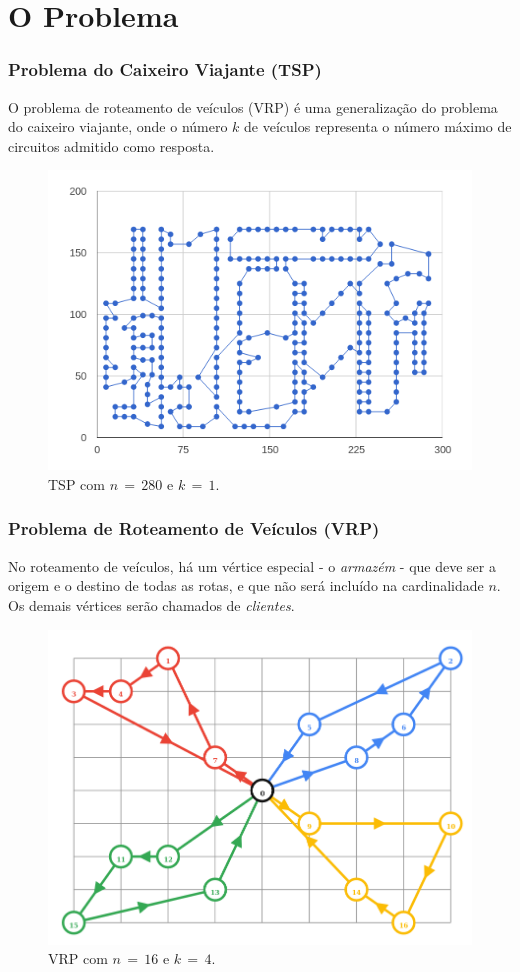 \documentclass{beamer}
\begin{document}
\section{O Problema} %

\begin{frame} %
    \frametitle{Problema do Caixeiro Viajante (TSP)}

    O problema de roteamento de veículos (VRP) é uma generalização do problema do caixeiro viajante, onde o número \(k\) de veículos representa o número máximo de circuitos admitido como resposta.

    \begin{figure}
        \includegraphics[width=0.59\linewidth]{tsp.png}
        \caption{TSP com \(n \, = \, 280\) e \(k \, = \, 1\).}
    \end{figure}

\end{frame}


\begin{frame} %
    \frametitle{Problema de Roteamento de Veículos (VRP)}

    No roteamento de veículos, há um vértice especial - o \emph{armazém} - que deve ser a origem e o destino de todas as rotas, e que não será incluído na cardinalidade \(n\). Os demais vértices serão chamados de \emph{clientes}.

    \begin{figure}
        \includegraphics[width=0.56\linewidth]{vrp.png}
        \caption{VRP com \(n \, = \, 16\) e \(k \, = \, 4\).}
    \end{figure}

\end{frame}
\end{document}
